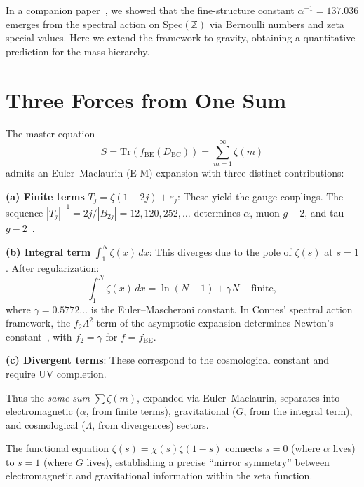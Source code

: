 \documentclass[aps,prl,twocolumn,superscriptaddress,nofootinbib]{revtex4-2}
\newcommand{\Spec}{\mathrm{Spec}}
\newcommand{\Tr}{\mathrm{Tr}}
\begin{document}
In a companion paper~\cite{WB_arithmetic}, we showed that the
fine-structure constant $\alpha^{-1}=137.036$ emerges from the
spectral action on $\Spec(\mathbb{Z})$ via Bernoulli numbers and
zeta special values.  Here we extend the framework to gravity,
obtaining a quantitative prediction for the mass hierarchy.

\section{Three Forces from One Sum}

The master equation~\cite{WB_arithmetic}
\begin{equation}\label{eq:master}
  S = \Tr\!\left(f_{\mathrm{BE}}(D_{\mathrm{BC}})\right)
  = \sum_{m=1}^{\infty}\zeta(m)
\end{equation}
admits an Euler--Maclaurin (E-M) expansion with three distinct
contributions:

\medskip
\noindent\textbf{(a) Finite terms} $T_j=\zeta(1{-}2j)+\varepsilon_j$:
These yield the gauge couplings.  The sequence
$|T_j|^{-1}=2j/|B_{2j}|=12,120,252,\ldots$ determines $\alpha$,
muon $g{-}2$, and tau $g{-}2$~\cite{WB_arithmetic}.

\medskip
\noindent\textbf{(b) Integral term} $\int_1^N\zeta(x)\,dx$:
This diverges due to the pole of $\zeta(s)$ at $s=1$.  After
regularization:
\begin{equation}
  \int_1^N\zeta(x)\,dx = \ln(N{-}1)+\gamma N+\text{finite},
\end{equation}
where $\gamma=0.5772\ldots$ is the Euler--Mascheroni constant.
In Connes' spectral action framework, the $f_2\Lambda^2$ term
of the asymptotic expansion determines Newton's
constant~\cite{Connes1996}, with $f_2=\gamma$ for
$f=f_{\mathrm{BE}}$.

\medskip
\noindent\textbf{(c) Divergent terms}: These correspond to the
cosmological constant and require UV completion.

\medskip
\noindent Thus the \emph{same sum} $\sum\zeta(m)$, expanded via
Euler--Maclaurin, separates into electromagnetic ($\alpha$, from
finite terms), gravitational ($G$, from the integral term), and
cosmological ($\Lambda$, from divergences) sectors.

The functional equation $\zeta(s)=\chi(s)\zeta(1{-}s)$ connects
$s=0$ (where $\alpha$ lives) to $s=1$ (where $G$ lives),
establishing a precise ``mirror symmetry'' between electromagnetic
and gravitational information within the zeta function.
\end{document}
